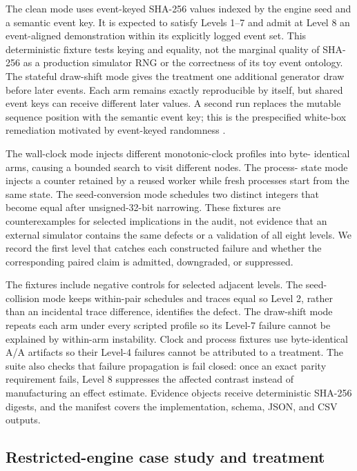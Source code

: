 \documentclass[aps,reprint,superscriptaddress,longbibliography,floatfix]{revtex4-2}
\begin{document}
The clean mode uses event-keyed SHA-256 values indexed by the engine seed and a
semantic event key.  It is expected to satisfy Levels 1--7 and admit at Level 8
an event-aligned demonstration within its explicitly logged event set.  This
deterministic fixture tests keying and equality, not the marginal quality of
SHA-256 as a production simulator RNG or the correctness of its toy event
ontology.  The
stateful draw-shift mode gives the treatment one additional generator draw
before later events.  Each arm remains exactly reproducible by itself, but
shared event keys can receive different later values.  A second run replaces
the mutable sequence position with the semantic event key; this is the
prespecified white-box remediation motivated by event-keyed randomness
\cite{buffalo2026eventkeyed}.

The wall-clock mode injects different monotonic-clock profiles into byte-
identical arms, causing a bounded search to visit different nodes.  The process-
state mode injects a counter retained by a reused worker while fresh processes
start from the same state.  The seed-conversion mode schedules two distinct
integers that become equal after unsigned-32-bit narrowing.  These fixtures are
counterexamples for selected implications in the audit, not evidence that an
external simulator contains the same defects or a validation of all eight
levels.  We record the first level that catches each constructed failure
and whether the corresponding paired claim is admitted, downgraded, or
suppressed.

The fixtures include negative controls for selected adjacent levels.  The seed-collision
mode keeps within-pair schedules and traces equal so Level 2, rather than an
incidental trace difference, identifies the defect.  The draw-shift mode repeats
each arm under every scripted profile so its Level-7 failure cannot be explained
by within-arm instability.  Clock and process fixtures use byte-identical A/A
artifacts so their Level-4 failures cannot be attributed to a treatment.  The
suite also checks that failure propagation is fail closed: once an exact parity
requirement fails, Level 8 suppresses the affected contrast instead of
manufacturing an effect estimate.  Evidence objects receive deterministic
SHA-256 digests, and the manifest covers the implementation, schema, JSON, and
CSV outputs.

\subsection{Restricted-engine case study and treatment}
\end{document}

